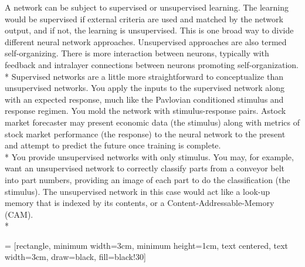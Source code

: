 \documentclass[12pt, right open]{memoir}
\begin{document}
A network can be subject to supervised or unsupervised learning. The learning would be supervised if external criteria are used and matched by the network output, and if not, the learning is unsupervised. This is one broad way to divide different neural network approaches. Unsupervised approaches are also termed self-organizing. There is more interaction between neurons, typically with feedback and intralayer connections between neurons promoting self-organization. \\*
Supervised networks are a little more straightforward to conceptualize than unsupervised networks. You apply the inputs to the supervised network along with an expected response, much like the Pavlovian conditioned stimulus and response regimen. You mold the network with stimulus-response pairs. Astock market forecaster may present economic data (the stimulus) along with metrics of stock market performance (the response) to the neural network to the present and attempt to predict the future once training is complete. \\*
You provide unsupervised networks with only stimulus. You may, for example, want an unsupervised network to correctly classify parts from a conveyor belt into part numbers, providing an image of each part to do the classification (the stimulus). The unsupervised network in this case would act like a look-up memory that is indexed by its contents, or a Content-Addressable-Memory (CAM). \\*

 = [rectangle, minimum width=3cm, minimum height=1cm, text centered, text width=3cm, draw=black, fill=black!30]

%
%
\end{document}
